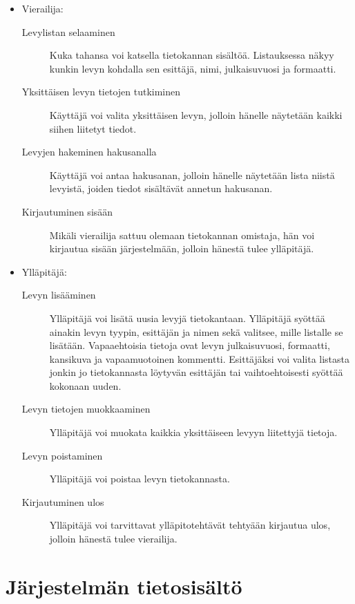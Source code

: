 \documentclass[a4paper,12pt]{report}
\begin{document}
\begin{itemize}

\item Vierailija:
\begin{description}
\item[Levylistan selaaminen] Kuka tahansa voi katsella tietokannan sisältöä.
Listauksessa näkyy kunkin levyn kohdalla sen esittäjä, nimi, julkaisuvuosi ja
formaatti.
\item[Yksittäisen levyn tietojen tutkiminen] Käyttäjä voi valita yksittäisen
levyn, jolloin hänelle näytetään kaikki siihen liitetyt tiedot.
\item[Levyjen hakeminen hakusanalla] Käyttäjä voi antaa hakusanan, jolloin
hänelle näytetään lista niistä levyistä, joiden tiedot sisältävät annetun
hakusanan.
\item[Kirjautuminen sisään] Mikäli vierailija sattuu olemaan tietokannan
omistaja, hän voi kirjautua sisään järjestelmään, jolloin hänestä tulee
ylläpitäjä.
\end{description}

\item Ylläpitäjä:
\begin{description}
\item[Levyn lisääminen] Ylläpitäjä voi lisätä uusia levyjä tietokantaan.
Ylläpitäjä syöttää ainakin levyn tyypin, esittäjän ja nimen sekä valitsee, mille
listalle se lisätään. Vapaaehtoisia tietoja ovat levyn julkaisuvuosi, formaatti,
kansikuva ja vapaamuotoinen kommentti. Esittäjäksi voi valita listasta jonkin jo
tietokannasta löytyvän esittäjän tai vaihtoehtoisesti syöttää kokonaan uuden.
\item[Levyn tietojen muokkaaminen] Ylläpitäjä voi muokata kaikkia yksittäiseen
levyyn liitettyjä tietoja.
\item[Levyn poistaminen] Ylläpitäjä voi poistaa levyn tietokannasta.
\item[Kirjautuminen ulos] Ylläpitäjä voi tarvittavat ylläpitotehtävät tehtyään
kirjautua ulos, jolloin hänestä tulee vierailija.
\end{description}

\end{itemize}

\section{Järjestelmän tietosisältö}
\end{document}
